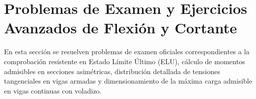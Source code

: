 \section{Problemas de Examen y Ejercicios Avanzados de Flexión y Cortante}

En esta sección se resuelven problemas de examen oficiales correspondientes a la comprobación resistente en Estado Límite Último (ELU), cálculo de momentos admisibles en secciones asimétricas, distribución detallada de tensiones tangenciales en vigas armadas y dimensionamiento de la máxima carga admisible en vigas continuas con voladizo.


